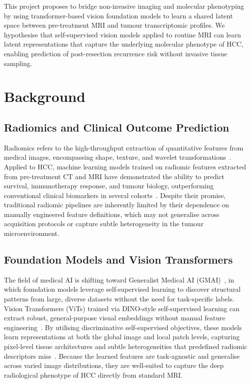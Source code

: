 \documentclass[12pt,twoside]{report}
\begin{document}
This project proposes to bridge non-invasive imaging and molecular phenotyping by
using transformer-based vision foundation models to learn a shared latent space between
pre-treatment MRI and tumour transcriptomic profiles.
We hypothesise that self-supervised vision models applied to routine MRI can learn latent representations
that capture the underlying molecular phenotype of HCC, enabling prediction of post-resection recurrence risk
without invasive tissue sampling.

\chapter{Background}

\section{Radiomics and Clinical Outcome Prediction}

Radiomics refers to the high-throughput extraction of quantitative features from medical images,
encompassing shape, texture, and wavelet transformations~\cite{lambin2012radiomics}.
Applied to HCC, machine learning models trained on radiomic features extracted from
pre-treatment CT and MRI have demonstrated the ability to predict survival, immunotherapy response,
and tumour biology, outperforming conventional clinical biomarkers in several cohorts~\cite{vithayathil2025machine}.
Despite their promise, traditional radiomic pipelines are inherently limited by their dependence on
manually engineered feature definitions, which may not generalise across acquisition protocols or
capture subtle heterogeneity in the tumour microenvironment.

\section{Foundation Models and Vision Transformers}

The field of medical AI is shifting toward Generalist Medical AI (GMAI)~\cite{moor2023foundation},
in which foundation models leverage self-supervised learning to discover structural patterns
from large, diverse datasets without the need for task-specific labels.
Vision Transformers (ViTs) trained via DINO-style self-supervised learning
can extract robust, general-purpose visual embeddings without manual feature engineering~\cite{oquab2024dinov2,caron2021emerging}.
By utilising discriminative self-supervised objectives, these models learn representations
at both the global image and local patch levels, capturing pixel-level tissue architectures and
subtle heterogeneities that predefined radiomic descriptors miss~\cite{oquab2024dinov2}.
Because the learned features are task-agnostic and generalise across varied image distributions,
they are well-suited to capture the deep radiological phenotype of HCC directly from standard MRI.
\end{document}

